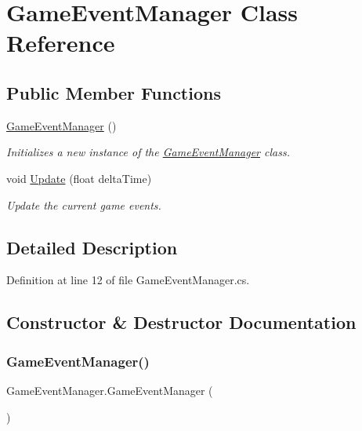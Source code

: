 \hypertarget{class_game_event_manager}{}\section{Game\+Event\+Manager Class Reference}
\label{class_game_event_manager}
\subsection*{Public Member Functions}
\begin{DoxyCompactItemize}
\item 
\hyperlink{class_game_event_manager_a1faec24715bbfd10aa28c5953e804c95}{Game\+Event\+Manager} ()
\begin{DoxyCompactList}\small\item\em Initializes a new instance of the \hyperlink{class_game_event_manager}{Game\+Event\+Manager} class. \end{DoxyCompactList}\item 
void \hyperlink{class_game_event_manager_aeff8359d24a5c9221ab2b5168c66278e}{Update} (float delta\+Time)
\begin{DoxyCompactList}\small\item\em Update the current game events. \end{DoxyCompactList}\end{DoxyCompactItemize}


\subsection{Detailed Description}


Definition at line 12 of file Game\+Event\+Manager.\+cs.



\subsection{Constructor \& Destructor Documentation}
\mbox{\label{class_game_event_manager_a1faec24715bbfd10aa28c5953e804c95}} 
\subsubsection{\texorpdfstring{Game\+Event\+Manager()}{GameEventManager()}}
{\footnotesize\ttfamily Game\+Event\+Manager.\+Game\+Event\+Manager (\begin{DoxyParamCaption}{ }\end{DoxyParamCaption})}



